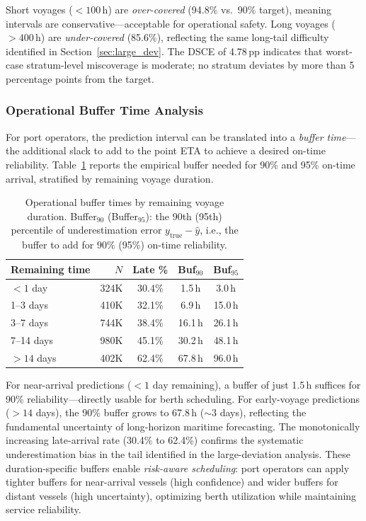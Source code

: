 \documentclass[conference]{IEEEtran}
\begin{document}
Short voyages ($< 100$\,h) are \textit{over-covered} (94.8\% vs.\ 90\% target), meaning intervals are conservative---acceptable for operational safety.
Long voyages ($> 400$\,h) are \textit{under-covered} (85.6\%), reflecting the same long-tail difficulty identified in Section~\ref{sec:large_dev}.
The DSCE of 4.78\,pp indicates that worst-case stratum-level miscoverage is moderate; no stratum deviates by more than 5 percentage points from the target.

\subsubsection{Operational Buffer Time Analysis}

For port operators, the prediction interval can be translated into a \textit{buffer time}---the additional slack to add to the point ETA to achieve a desired on-time reliability.
Table~\ref{tab:buffer} reports the empirical buffer needed for 90\% and 95\% on-time arrival, stratified by remaining voyage duration.

\begin{table}[t]
    \centering
    \caption{Operational buffer times by remaining voyage duration. Buffer$_{90}$ (Buffer$_{95}$): the 90th (95th) percentile of underestimation error $y_\text{true} - \hat{y}$, i.e., the buffer to add for 90\% (95\%) on-time reliability.}
    \label{tab:buffer}
    \footnotesize
    \begin{tabular}{lrccc}
        \toprule
        \textbf{Remaining time} & \textbf{$N$} & \textbf{Late \%} & \textbf{Buf$_{90}$} & \textbf{Buf$_{95}$} \\
        \midrule
        $< 1$ day     & 324K  & 30.4\% & 1.5\,h  & 3.0\,h \\
        1--3 days     & 410K  & 32.1\% & 6.9\,h  & 15.0\,h \\
        3--7 days     & 744K  & 38.4\% & 16.1\,h & 26.1\,h \\
        7--14 days    & 980K  & 45.1\% & 30.2\,h & 48.1\,h \\
        $> 14$ days   & 402K  & 62.4\% & 67.8\,h & 96.0\,h \\
        \bottomrule
    \end{tabular}
\end{table}

For near-arrival predictions ($< 1$ day remaining), a buffer of just 1.5\,h suffices for 90\% reliability---directly usable for berth scheduling.
For early-voyage predictions ($> 14$ days), the 90\% buffer grows to 67.8\,h ($\sim$3 days), reflecting the fundamental uncertainty of long-horizon maritime forecasting.
The monotonically increasing late-arrival rate (30.4\% to 62.4\%) confirms the systematic underestimation bias in the tail identified in the large-deviation analysis.
These duration-specific buffers enable \textit{risk-aware scheduling}: port operators can apply tighter buffers for near-arrival vessels (high confidence) and wider buffers for distant vessels (high uncertainty), optimizing berth utilization while maintaining service reliability.
\end{document}
